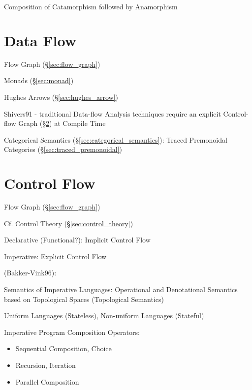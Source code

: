 Composition of Catamorphism followed by Anamorphism



\section{Data Flow}\label{sec:data_flow}

\fist Flow Graph (\S\ref{sec:flow_graph})

Monads (\S\ref{sec:monad})

Hughes Arrows (\S\ref{sec:hughes_arrow})

Shivers91 - traditional Data-flow Analysis techniques require an
explicit Control-flow Graph (\S\ref{sec:control_flow}) at Compile Time

Categorical Semantics (\S\ref{sec:categorical_semantics}): Traced
Premonoidal Categories (\S\ref{sec:traced_premonoidal})



\section{Control Flow}\label{sec:control_flow}

\fist Flow Graph (\S\ref{sec:flow_graph})

\fist Cf. Control Theory (\S\ref{sec:control_theory})

Declarative (Functional?): Implicit Control Flow

Imperative: Explicit Control Flow

(Bakker-Vink96):

Semantics of Imperative Languages: Operational and Denotational
Semantics based on Topological Spaces (Topological Semantics)

Uniform Languages (Stateless), Non-uniform Languages (Stateful)

Imperative Program Composition Operators:
\begin{itemize}
  \item Sequential Composition, Choice
  \item Recursion, Iteration
  \item Parallel Composition
\end{itemize}

